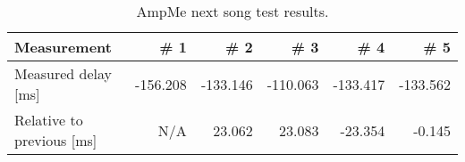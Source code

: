 \begin{table}[ht]
\centering
\begin{tabularx}{0.9\textwidth}{Xrrrrr}
\toprule
Measurement                 & \# 1      & \# 2     & \# 3     & \# 4     & \# 5      \\ \midrule
Measured delay [ms]         & -156.208  & -133.146 & -110.063 & -133.417 & -133.562  \\
Relative to previous [ms]   & N/A       & 23.062   & 23.083   & -23.354   & -0.145    \\ \bottomrule
\end{tabularx}
\caption{AmpMe next song test results.}
\label{fig:ampmenextsongfigure}
\end{table}
